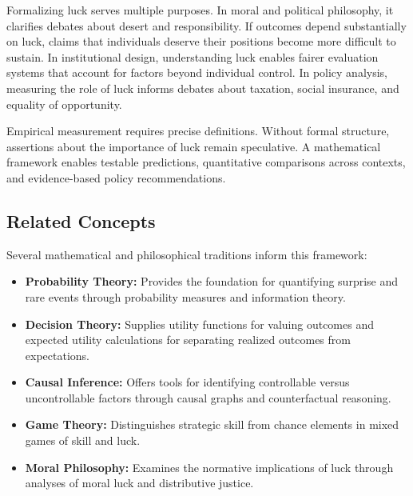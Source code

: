   Formalizing luck serves multiple purposes. In moral and political philosophy,
  it clarifies debates about desert and responsibility. If outcomes depend
  substantially on luck, claims that individuals deserve their positions
  become more difficult to sustain. In institutional design,
  understanding luck enables fairer evaluation systems that account for
  factors beyond individual control. In policy analysis, measuring the
  role of luck informs debates about taxation, social insurance, and
  equality of opportunity.

  Empirical measurement requires precise definitions. Without formal structure,
  assertions about the importance of luck remain speculative. A mathematical
  framework enables testable predictions, quantitative comparisons
  across contexts, and evidence-based policy recommendations.

  \subsection{Related Concepts}

  Several mathematical and philosophical traditions inform this
  framework:

  \begin{itemize}
    \item \textbf{Probability Theory:} Provides the foundation for
      quantifying surprise and rare events through probability measures
      and information theory.

    \item \textbf{Decision Theory:} Supplies utility functions for
      valuing outcomes and expected utility calculations for separating
      realized outcomes from expectations.

    \item \textbf{Causal Inference:} Offers tools for identifying
      controllable versus uncontrollable factors through causal graphs
      and counterfactual reasoning.

    \item \textbf{Game Theory:} Distinguishes strategic skill from
      chance elements in mixed games of skill and luck.

    \item \textbf{Moral Philosophy:} Examines the normative implications
      of luck through analyses of moral luck and distributive justice.
  \end{itemize}

